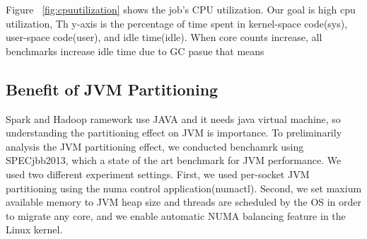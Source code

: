 \fi



\ifkor
Figure ~\ref{fig:cpuutilization} shows the job's CPU utilization.
Our goal is high cpu utilization, 
Th y-axis is the percentage of time spent in kernel-space code(sys), user-space
code(user), and idle time(idle).
When core counts increase, all benchmarks increase idle time due to GC pasue
that means 

\else

\fi


\ifkor
\else

\fi



\subsection{Benefit of JVM Partitioning}


\ifkor
Spark and Hadoop ramework use JAVA and it needs java virtual machine, so
understanding the partitioning effect on JVM is importance.
To preliminarily analysis the JVM partitioning effect, we conducted
benchamrk using SPECjbb2013, which a state of the art benchmark for
JVM performance.
We used two different experiment settings. First, we used per-socket
JVM partitioning using the numa control application(numactl).
Second, we set maxium available memory to JVM heap size and
threads are scheduled by the OS in order to migrate any core, and we
enable automatic NUMA balancing feature in the Linux kernel.
\else
\fi

